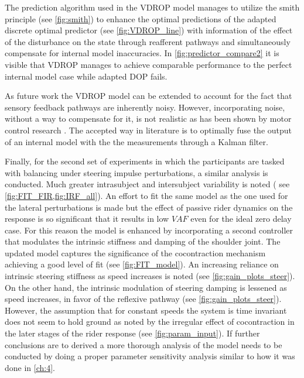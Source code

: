The  prediction algorithm used in the VDROP model  manages to utilize the smith  principle (see \cref{fig:smith}) to enhance the optimal  predictions of the adapted discrete optimal predictor (see \cref{fig:VDROP_line}) with  information of the effect of the disturbance on the state through reafferent pathways and simultaneously compensate for internal model inaccuracies. In \cref{fig:predictor_compare2} it is visible that VDROP manages to achieve comparable performance to the perfect internal model case while adapted DOP fails. 
 
As future work the VDROP model can be extended to account for the fact that sensory feedback pathways are inherently noisy. However, incorporating noise,  without a way to compensate for it, is not realistic as has been shown by motor control research \cite{wolpert1995internal}. The accepted way in literature is to optimally fuse the output of an internal model with the the measurements through a Kalman filter. 
 
Finally, for the second set of experiments in which the participants are tasked with balancing under steering impulse perturbations, a similar analysis is conducted. Much greater intrasubject and intersubject variability is noted ( see \cref{fig:FIT_FIR,fig:IRF_all}). An effort to fit the same model as the one used for the lateral perturbations is made but the effect of passive rider dynamics on the response is so significant that it results in low \ensuremath{\mathit{VAF}} even for the ideal zero delay case. For this reason the model is enhanced by incorporating a second controller that modulates the intrinsic stiffness and damping of the shoulder joint. The updated model captures the significance of the cocontraction mechanism achieving a good level of fit (see \cref{fig:FIT_model}). An increasing reliance on intrinsic steering stiffness as speed increases is noted (see \cref{fig:gain_plots_steer}). On the other hand, the intrinsic modulation of steering damping is lessened as speed increases, in favor of the reflexive pathway (see \cref{fig:gain_plots_steer}). However, the assumption that for constant speeds the system is time invariant does not seem to hold ground as noted by the irregular effect of cocontraction in the later stages of the rider  response (see \cref{fig:param_input}). If further conclusions are to derived a more thorough analysis of the model needs to be conducted by doing a proper parameter sensitivity analysis similar to how it was done in \cref{ch:4}.
 
